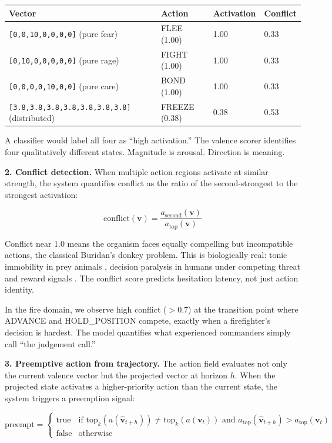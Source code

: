 \documentclass[11pt]{article}
\begin{document}
\begin{table}[h]
\centering
\small
\begin{tabular}{llll}
\toprule
\textbf{Vector} & \textbf{Action} & \textbf{Activation} & \textbf{Conflict} \\
\midrule
\texttt{[0,0,10,0,0,0,0]} (pure fear) & FLEE (1.00) & 1.00 & 0.33 \\
\texttt{[0,10,0,0,0,0,0]} (pure rage) & FIGHT (1.00) & 1.00 & 0.33 \\
\texttt{[0,0,0,0,10,0,0]} (pure care) & BOND (1.00) & 1.00 & 0.33 \\
\texttt{[3.8,3.8,3.8,3.8,3.8,3.8,3.8]} (distributed) & FREEZE (0.38) & 0.38 & 0.53 \\
\bottomrule
\end{tabular}
\end{table}

A classifier would label all four as ``high activation.'' The valence scorer identifies four qualitatively different states. Magnitude is arousal. Direction is meaning.

\textbf{2. Conflict detection.} When multiple action regions activate at similar strength, the system quantifies conflict as the ratio of the second-strongest to the strongest activation:

\begin{equation}
\text{conflict}(\mathbf{v}) = \frac{a_{\text{second}}(\mathbf{v})}{a_{\text{top}}(\mathbf{v})}
\end{equation}

Conflict near 1.0 means the organism faces equally compelling but incompatible actions, the classical Buridan's donkey problem. This is biologically real: tonic immobility in prey animals \citep{gallup1977}, decision paralysis in humans under competing threat and reward signals \citep{corr2013}. The conflict score predicts hesitation latency, not just action identity.

In the fire domain, we observe high conflict ($>$0.7) at the transition point where ADVANCE and HOLD\_POSITION compete, exactly when a firefighter's decision is hardest. The model quantifies what experienced commanders simply call ``the judgement call.''

\textbf{3. Preemptive action from trajectory.} The action field evaluates not only the current valence vector but the projected vector at horizon $h$. When the projected state activates a higher-priority action than the current state, the system triggers a preemption signal:

\begin{equation}
\text{preempt} = \begin{cases} \text{true} & \text{if } \text{top}_k(a(\hat{\mathbf{v}}_{t+h})) \neq \text{top}_k(a(\mathbf{v}_t)) \text{ and } a_{\text{top}}(\hat{\mathbf{v}}_{t+h}) > a_{\text{top}}(\mathbf{v}_t) \\ \text{false} & \text{otherwise} \end{cases}
\end{equation}
\end{document}
